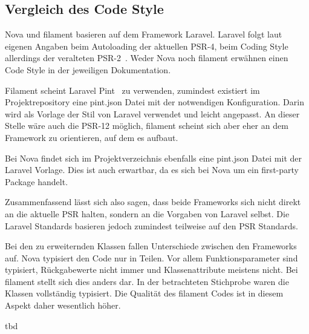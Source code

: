 \subsection{Vergleich des Code Style}
Nova und filament basieren auf dem Framework Laravel.
Laravel folgt laut eigenen Angaben beim Autoloading der aktuellen PSR-4, beim Coding Style allerdings der veralteten PSR-2~\cite{laravel-docs-coding-style}.
Weder Nova noch filament erwähnen einen Code Style in der jeweiligen Dokumentation.

Filament scheint Laravel Pint~\cite{laravel-docs-pint} zu verwenden, zumindest existiert im Projektrepository eine pint.json Datei mit der notwendigen Konfiguration.
Darin wird als Vorlage der Stil von Laravel verwendet und leicht angepasst.
An dieser Stelle wäre auch die PSR-12 möglich, filament scheint sich aber eher an dem Framework zu orientieren, auf dem es aufbaut.

Bei Nova findet sich im Projektverzeichnis ebenfalls eine pint.json Datei mit der Laravel Vorlage.
Dies ist auch erwartbar, da es sich bei Nova um ein first-party Package handelt.

Zusammenfassend lässt sich also sagen, dass beide Frameworks sich nicht direkt an die aktuelle PSR halten, sondern an die Vorgaben von Laravel selbst.
Die Laravel Standards basieren jedoch zumindest teilweise auf den PSR Standards.

Bei den zu erweiternden Klassen fallen Unterschiede zwischen den Frameworks auf.
Nova typisiert den Code nur in Teilen.
Vor allem Funktionsparameter sind typisiert, Rückgabewerte nicht immer und Klassenattribute meistens nicht.
Bei filament stellt sich dies anders dar.
In der betrachteten Stichprobe waren die Klassen vollständig typisiert.
Die Qualität des filament Codes ist in diesem Aspekt daher wesentlich höher.

\color{red}
tbd
\color{black}
